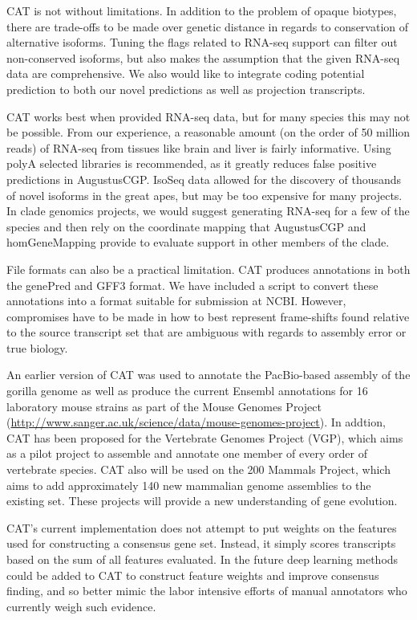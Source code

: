 \documentclass[fleqn,10pt]{wlscirep}
\begin{document}
CAT is not without limitations. In addition to the problem of opaque biotypes, there are trade-offs to be made over genetic distance in regards to conservation of alternative isoforms. Tuning the flags related to RNA-seq support can filter out non-conserved isoforms, but also makes the assumption that the given RNA-seq data are comprehensive. We also would like to integrate coding potential prediction\cite{lin2011phylocsf} to both our novel predictions as well as projection transcripts. 

CAT works best when provided RNA-seq data, but for many species this may not be possible. From our experience, a reasonable amount (on the order of 50 million reads) of RNA-seq from tissues like brain and liver is fairly informative. Using polyA selected libraries is recommended, as it greatly reduces false positive predictions in AugustusCGP. IsoSeq data allowed for the discovery of thousands of novel isoforms in the great apes, but may be too expensive for many projects. In clade genomics projects, we would suggest generating RNA-seq for a few of the species and then rely on the coordinate mapping that AugustusCGP and homGeneMapping provide to evaluate support in other members of the clade.

File formats can also be a practical limitation. CAT produces annotations in both the genePred and GFF3 format. We have included a script to convert these annotations into a format suitable for submission at NCBI. However, compromises have to be made in how to best represent frame-shifts found relative to the source transcript set that are ambiguous with regards to assembly error or true biology.

An earlier version of CAT was used to annotate the PacBio-based assembly of the gorilla genome \cite{gordon2016long} as well as produce the current Ensembl annotations for 16 laboratory mouse strains as part of the Mouse Genomes Project (\url{http://www.sanger.ac.uk/science/data/mouse-genomes-project}). In addtion, CAT has been proposed for the Vertebrate Genomes Project (VGP), which aims as a pilot project to assemble and annotate one member of every order of vertebrate species. CAT also will be used on the 200 Mammals Project, which aims to add approximately 140 new mammalian genome assemblies to the existing set. These projects will provide a new understanding of gene evolution.

CAT’s current implementation does not attempt to put weights on the features used for constructing a consensus gene set. Instead, it simply scores transcripts based on the sum of all features evaluated. In the future deep learning methods could be added to CAT to construct feature weights and improve consensus finding, and so better mimic the labor intensive efforts of manual annotators who currently weigh such evidence.
\end{document}
